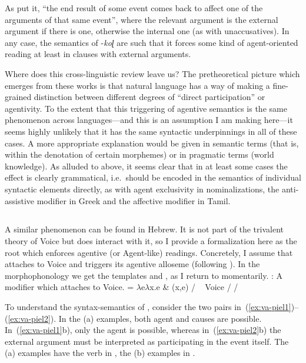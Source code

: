 As \citet[165]{sundaresanmcfadden17} put it, ``the end result of some event comes back to affect one of the arguments of that same event'', where the relevant argument is the external argument if there is one, otherwise the internal one (as with unaccusatives). In any case, the semantics of -\emph{koɭ} are such that it forces some kind of agent-oriented reading at least in clauses with external arguments.

Where does this cross-linguistic review leave us? The pretheoretical picture which emerges from these works is that natural language has a way of making a fine-grained distinction between different degrees of ``direct participation'' or agentivity. To the extent that this triggering of agentive semantics is the same phenomenon across languages---and this is an assumption I am making here---it seems highly unlikely that it has the same syntactic underpinnings in all of these cases. A more appropriate explanation would be given in semantic terms (that is, within the denotation of certain morphemes) or in pragmatic terms (world knowledge). As alluded to above, it seems clear that in at least some cases the effect is clearly grammatical, i.e.~should be encoded in the semantics of individual syntactic elements directly, as with agent exclusivity in nominalizations, the anti-assistive modifier in Greek and the affective modifier in Tamil.


	\subsection{\va} \label{voice:va:heb}
A similar phenomenon can be found in Hebrew. It is not part of the trivalent theory of Voice but does interact with it, so I provide a formalization here as the root {\va} which enforces agentive (or Agent-like) readings. Concretely, I assume that {\va} attaches to Voice and triggers its agentive alloseme (following \citealt{doron03,doron14adj}). In the morphophonology we get the templates {\tpie} and {\thit}, as I return to momentarily.
\pex {\va}:
	\a A modifier which attaches to Voice.
	\a {} = $\lambda$e$\lambda$x.e \& (x,e) / \trace~\va
	\a Voice {\lra} {\tpie} / {\va} {\trace}
	\a {\vz} {\lra} {\thit} / {\va} {\trace}
\xe

To understand the syntax-semantics of {\vz}, consider the two pairs in~(\ref{ex:va-piel1})--(\ref{ex:va-piel2}). In the (a) examples, both agent and causes are possible. In~(\ref{ex:va-piel1}b), only the agent is possible, whereas in~(\ref{ex:va-piel2}b) the external argument must be interpreted as participating in the event itself. The (a) examples have the verb in {\tkal}, the (b) examples in {\tpie}.

